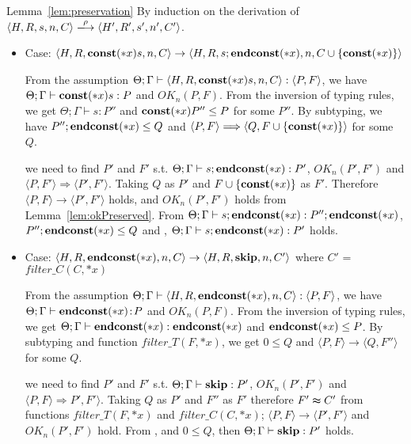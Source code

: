 \begin{pfof}{Lemma~\ref{lem:preservation}}
By induction on the derivation of \(\langle H, R, s, n, C \rangle
\xlongrightarrow{\rho} \langle H' ,R' ,s', n', C' \rangle\).

\begin{itemize}

\item Case: \( \langle H, R, \mathbf{const}(*x) s, n, C \rangle
  \rightarrow \langle H, R, s;\mathbf{endconst}(*x), n, C\cup
  \{\mathbf{const}(*x)\} \rangle \)

  From the assumption \( \Theta; \Gamma \vdash \langle H, R,
  \mathbf{const}(*x) s, n, C \rangle : \langle P, F \rangle\), we have \(
  \Theta; \Gamma \vdash \mathbf{const}(*x) s: P \) and \( OK_n(P, F) \). From
  the inversion of typing rules, we get \( \Theta; \Gamma \vdash s:P''
  \) and \( \mathbf{const}(*x) P'' \le P \) for some \( P'' \). By subtyping,
  we have \( P'';\mathbf{endconst}(*x) \le Q \) and \( \langle P, F \rangle
  \Longrightarrow \langle Q, F\cup \{\mathbf{const}(*x)\} \rangle \) for some
  \( Q \).

  we need to find \(P'\) and \(F'\) s.t. \( \Theta; \Gamma \vdash
  s;\mathbf{endconst}(*x):P'\), \( OK_n(P', F')\) and \( \langle P, F' \rangle
  \Longrightarrow \langle P', F' \rangle \). Taking \( Q \) as \( P'\)
  and \( F \cup \{\mathbf{const}(*x)\} \) as \(F'\). Therefore \( \langle P, F
  \rangle \rightarrow \langle P', F' \rangle\) holds, and \( OK_n(P',
  F')\) holds from Lemma~\ref{lem:okPreserved}. From \( \Theta; \Gamma
  \vdash s;\mathbf{endconst}(*x):P'';\mathbf{endconst}(*x) \), \( P'';\mathbf{endconst}(*x) \le Q \) and
  , \( \Theta; \Gamma \vdash s;\mathbf{endconst}(*x):P'\) holds.

\item Case: \( \langle H, R, \mathbf{endconst}(*x), n, C \rangle \rightarrow
  \langle H, R, \mathbf{skip}, n, C' \rangle \) where \(C'\) = \(filter\_C(C,
  *x)\)

   From the assumption \( \Theta; \Gamma \vdash \langle H, R,
   \mathbf{endconst}(*x), n, C \rangle : \langle P, F \rangle\), we have \(
   \Theta; \Gamma \vdash \mathbf{endconst}(*x) \!:\! P\) and \( OK_n(P, F) \). From
   the inversion of typing rules, we get \( \Theta; \Gamma \vdash
   \mathbf{endconst}(*x):\mathbf{endconst}(*x) \) and \( \mathbf{endconst}(*x) \le P \). By subtyping and
   function \(filter\_T(F, *x)\), we get \( 0 \le Q \) and \( \langle
   P, F \rangle \rightarrow \langle Q, F'' \rangle\) for some \( Q \).

   we need to find \(P'\) and \(F'\) s.t. \( \Theta; \Gamma \vdash
  \mathbf{skip}:P'\), \( OK_n(P', F')\) and \( \langle P, F \rangle
  \Longrightarrow P', F' \rangle \). Taking \( Q \) as \( P'\) and
  \(F''\) as \(F'\) therefore \(F' \thickapprox C'\) from functions
  \(filter\_T(F, *x)\) and \(filter\_C(C, *x)\); \( \langle P, F
  \rangle \rightarrow \langle P', F' \rangle\) and \( OK_n(P', F')\)
  hold. From ,  and \( 0 \le Q\), then \( \Theta;
  \Gamma \vdash \mathbf{skip}:P'\) holds.


\end{itemize}
\end{pfof}
